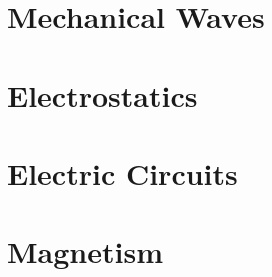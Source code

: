 \documentclass[english,twoside]{labmanual} %
\begin{document}


\tableofcontents{}

\part{Mechanical Waves}





\part{Electrostatics}

















\part{Electric Circuits}



	
	


	
	

\part{Magnetism}
\end{document}
